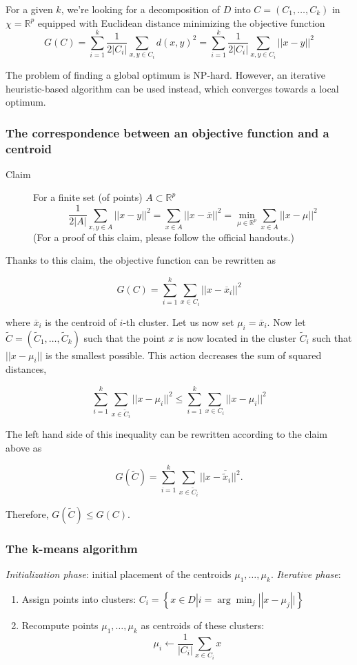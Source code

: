 \documentclass[a4paper]{article}
\begin{document}
	For a given $k$, we're looking for a decomposition of $D$ into $C = (C_1, \ldots, C_k)$
	in $\chi = \mathbb{R}^p$ equipped with Euclidean distance minimizing the objective
	function
	\[
	G(C) = \sum_{i = 1}^{k} \frac{1}{2|C_i|} \sum_{x, y \in C_i} d(x, y)^2
	     = \sum_{i = 1}^{k} \frac{1}{2|C_i|} \sum_{x, y \in C_i} ||x - y||^2
	\]

	The problem of finding a global optimum is NP-hard. However, an iterative
	heuristic-based algorithm can be used instead, which converges towards a local optimum.

	\subsubsection{The correspondence between an objective function and a centroid}
	\begin{description}
		\item[Claim] For a finite set (of points) $A \subset \mathbb{R}^p$
			\[
			\frac{1}{2|A|} \sum_{x, y \in A} ||x - y||^2
			= \sum_{x \in A} ||x - \overline{x}||^2
			= \min_{\mu \in \mathbb{R}^p} \sum_{x \in A} ||x - \mu||^2
			\]
			(For a proof of this claim, please follow the official handouts.)
	\end{description}

	Thanks to this claim, the objective function can be rewritten as

	$$ G(C) = \sum_{i = 1}^{k} \sum_{x \in C_i} ||x - \overline{x}_i||^2 $$

	where $\overline{x}_i$ is the centroid of $i$-th cluster. Let us now set
	$\mu_i = \overline{x}_i$. Now let $\widetilde{C} = (\widetilde{C}_1, \ldots, \widetilde{C}_k)$
	such that the point $x$ is now located in the cluster $\widetilde{C}_i$ such that
	$||x - \mu_i||$ is the smallest possible. This action decreases the sum of squared
	distances,

	$$
	\sum_{i = 1}^k \sum_{x \in \widetilde{C}_i} ||x - \mu_i||^2
	\le
	\sum_{i = 1}^k \sum_{x \in C_i} ||x - \mu_i||^2
	$$

	The left hand side of this inequality can be rewritten according to
	the claim above	as

	\[
		G(\widetilde{C}) = \sum_{i = 1}^k \sum_{x \in \widetilde{C}_i} ||x - \overline{\widetilde{x}}_i||^2
	.\] 

	Therefore, $G(\widetilde{C}) \le G(C)$.

	\subsubsection{The k-means algorithm}
	\textit{Initialization phase}: initial placement of the centroids $\mu_1, \ldots, \mu_k$.
	\textit{Iterative phase}:
	\begin{enumerate}
		\item Assign points into clusters: $C_i = \left\{ x \in D | i = \arg \min_j ||x - \mu_j||\right\}$
		\item Recompute points $\mu_1, \ldots, \mu_k$ as centroids of these clusters:
			$$\mu_i \leftarrow \frac{1}{|C_i|} \sum_{x \in C_i} x$$
	\end{enumerate}
\end{document}

